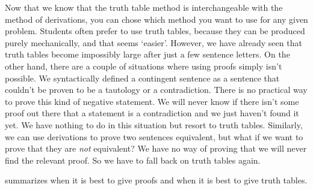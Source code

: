 Now that we know that the truth table method is interchangeable with the method of derivations, you can chose which method you want to use for any given problem. Students often prefer to use truth tables, because they can be produced purely mechanically, and that seems `easier'. However, we have already seen that truth tables become impossibly large after just a few sentence letters. On the other hand, there are a couple of situations where using proofs simply isn't possible. We syntactically defined a contingent sentence as a sentence that couldn't be proven to be a tautology or a contradiction. There is no practical way to prove this kind of negative statement. We will never know if there isn't some proof out there that a statement is a contradiction and we just haven't found it yet. We have nothing to do in this situation but resort to truth tables. Similarly, we can use derivations to prove two sentences equivalent, but what if we want to prove that they are \emph{not} equivalent? We have no way of proving that we will never find the relevant proof. So we have to fall back on truth tables again.

 summarizes when it is best to give proofs 
and when it is best to give truth tables.

\def\tmptable{\textbf{Logical property} 	&	\textbf{To prove it present} 	&	\textbf{To prove it absent} \\ \hline \hline
Being a tautology/theorem 		& Derive the sentence  						& Find a false line in the truth table for the sentence \\ \hline
Being a contradiction 	&  Derive $\ered$ from the sentence  		 & Find a true line in the truth table for the sentence\\ \hline
Contingency 			& Find a false line and a true line in the truth table for the sentence & Prove the sentence or its negation\\ \hline
Equivalence 			& Derive each sentence from the other 		 & Find a line in the truth tables for the sentence where they have different values\\ \hline
Consistency 		& Find a line in truth table for the sentence where they all are true & Derive $\ered$ from the sentences\\ \hline
Validity 				& Derive the conclusion from the premises & Find a line in the truth table where the premises are true and the conclusion false. \\ }

